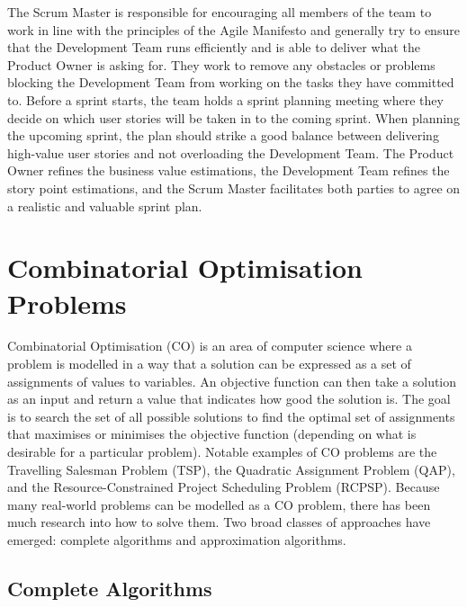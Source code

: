 The Scrum Master is responsible for encouraging all members of the team to work in line with the principles of the Agile Manifesto and generally try to ensure that the Development Team runs efficiently and is able to deliver what the Product Owner is asking for. They work to remove any obstacles or problems blocking the Development Team from working on the tasks they have committed to. Before a sprint starts, the team holds a sprint planning meeting where they decide on which user stories will be taken in to the coming sprint. When planning the upcoming sprint, the plan should strike a good balance between delivering high-value user stories and not overloading the Development Team. The Product Owner refines the business value estimations, the Development Team refines the story point estimations, and the Scrum Master facilitates both parties to agree on a realistic and valuable sprint plan.

\section{Combinatorial Optimisation Problems}

Combinatorial Optimisation (CO) is an area of computer science where a problem is modelled in a way that a solution can be expressed as a set of assignments of values to variables. An objective function can then take a solution as an input and return a value that indicates how good the solution is. The goal is to search the set of all possible solutions to find the optimal set of assignments that maximises or minimises the objective function (depending on what is desirable for a particular problem). Notable examples of CO problems are the Travelling Salesman Problem (TSP), the Quadratic Assignment Problem (QAP), and the Resource-Constrained Project Scheduling Problem (RCPSP). Because many real-world problems can be modelled as a CO problem, there has been much research into how to solve them. Two broad classes of approaches have emerged: complete algorithms and approximation algorithms.

\subsection{Complete Algorithms}

